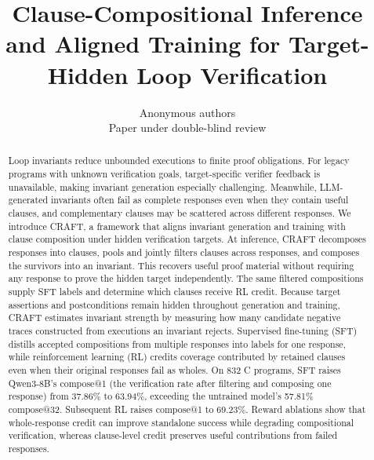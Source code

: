 \documentclass{article}
\title{Clause-Compositional Inference and Aligned Training
for Target-Hidden Loop Verification}
\author{
  Anonymous authors\\
  Paper under double-blind review
}
\theoremstyle{definition}
\begin{document}
\maketitle

\begin{abstract}
Loop invariants reduce unbounded executions to finite proof obligations.
For legacy programs with unknown verification goals,
target-specific verifier feedback is unavailable, making invariant generation
especially challenging.  Meanwhile, LLM-generated invariants often fail
as complete responses even when they contain useful clauses, and complementary
clauses may be scattered across different responses.  We introduce CRAFT, a framework that aligns invariant
generation and training with clause composition under hidden verification
targets.  At inference, CRAFT decomposes responses
into clauses, pools and jointly filters clauses across responses, and composes
the survivors into an invariant.  This recovers useful proof material without
requiring any response to prove the hidden target independently.
The same filtered compositions supply SFT labels and determine which clauses
receive RL credit.  Because target assertions and postconditions remain hidden
throughout generation and training, CRAFT estimates invariant strength by
measuring how many candidate negative traces constructed from executions an
invariant rejects.  Supervised fine-tuning (SFT) distills accepted compositions
from multiple responses into labels for one response, while reinforcement
learning (RL) credits coverage contributed by retained clauses even when their
original responses fail as wholes.  On 832 C programs, SFT raises Qwen3-8B's
compose@1 (the verification rate after filtering and composing one response)
from 37.86\% to 63.94\%, exceeding the untrained model's 57.81\%
compose@32.  Subsequent RL raises compose@1 to 69.23\%.  Reward ablations show
that whole-response credit can improve standalone success while degrading
compositional verification, whereas clause-level credit preserves useful
contributions from failed responses.
\end{abstract}







\clearpage





\newpage
\appendix

\end{document}
